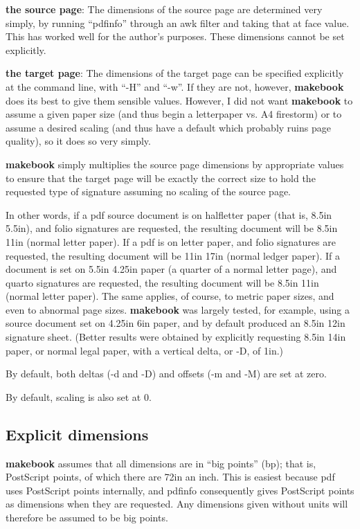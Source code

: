 \documentclass[12pt,twoside,final]{extarticle}
\begin{document}
{\sc\bfseries the source page}: The dimensions of the source page are determined very simply, by running ``pdfinfo'' through an awk filter and taking that at face value. This has worked well for the author's purposes. These dimensions cannot be set explicitly.

{\sc\bfseries the target page}: The dimensions of the target page can be specified explicitly at the command line, with ``-H'' and ``-w''. If they are not, however, \textbf{makebook} does its best to give them sensible values. However, I did not want \textbf{makebook} to assume a given paper size (and thus begin a letterpaper vs. A4 firestorm) or to assume a desired scaling (and thus have a default which probably ruins page quality), so it does so very simply.

\textbf{makebook} simply multiplies the source page dimensions by appropriate values to ensure that the target page will be exactly the correct size to hold the requested type of signature assuming no scaling of the source page.

In  other  words, if a pdf source document is on halfletter paper (that is, 8.5in {\selectfont{}} 5.5in), and folio signatures are requested, the resulting document will be 8.5in {\selectfont{}} 11in (normal letter paper). If a pdf is on letter paper, and folio signatures are requested, the resulting document will be 11in {\selectfont{}} 17in (normal ledger paper). If a document is set on 5.5in {\selectfont{}} 4.25in paper (a quarter of a normal letter page), and quarto signatures are requested, the resulting document will be 8.5in {\selectfont{}} 11in (normal letter paper). The same applies, of course, to metric paper sizes, and even to abnormal page sizes. \textbf{makebook} was largely tested, for example, using a source document set on 4.25in {\selectfont{}} 6in paper, and by default produced an 8.5in {\selectfont{}} 12in signature sheet. (Better results were obtained by explicitly requesting 8.5in {\selectfont{}} 14in paper, or normal legal paper, with a vertical delta, or -D, of 1in.)

By default, both deltas (-d and -D) and offsets (-m and -M) are set at zero.

By default, scaling is also set at 0.
\subsection{Explicit dimensions}
\textbf{makebook} assumes that all dimensions are in ``big points'' (bp); that is, PostScript points, of which there are 72in an inch. This is easiest because pdf uses PostScript points internally, and pdfinfo consequently gives PostScript points as dimensions when they are requested. Any dimensions given without units will therefore be assumed to be big points.
\end{document}
